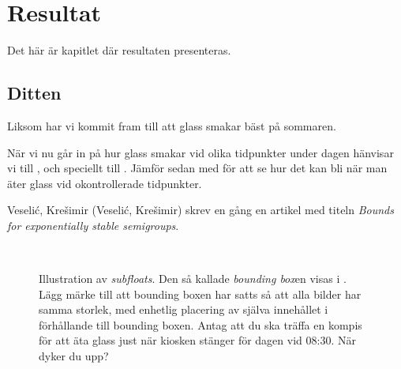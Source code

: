\chapter{Resultat}\label{cha:Research}
%
Det här är kapitlet där resultaten presenteras.


\section{Ditten}\label{sec:research:history}
%
Liksom \citep{Duck:2005} har vi kommit fram till att glass smakar bäst på sommaren.



När vi nu går in på hur glass smakar vid olika tidpunkter under dagen hänvisar vi till , och speciellt till .  Jämför sedan med  för att se hur det kan bli när man äter glass vid okontrollerade tidpunkter.

Veselić, Krešimir (Veseli\'{c}, Kre\v{s}imir) skrev en gång en artikel med titeln \emph{Bounds for exponentially stable semigroups}.

\begin{figure}[tbp]
  \centering
  \qquad
  \\
  \qquad
  \caption{\label{fig:times}%
    Illustration av \emph{subfloats}.  Den så kallade \emph{bounding box}en visas i \protect{}.  Lägg märke till att bounding boxen har satts så att alla bilder har samma storlek, med enhetlig placering av själva innehållet i förhållande till bounding boxen.  Antag att du ska träffa en kompis för att äta glass just när kiosken stänger för dagen vid 08:30.  När dyker du upp?}
\end{figure}

